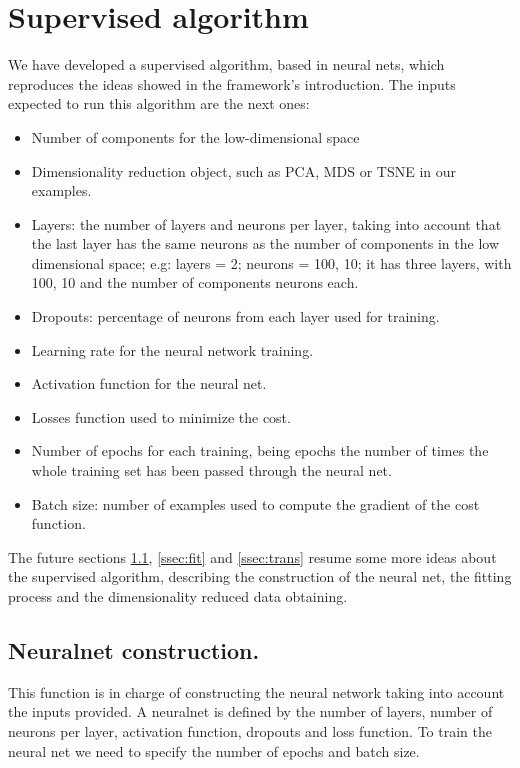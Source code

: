 \documentclass[a4paper,11pt,spanish]{report}
\begin{document}
\newpage

\section{Supervised algorithm}
\label{sec:sup}

We have developed a supervised algorithm, based in neural nets, which reproduces the ideas showed in the framework's introduction.
The inputs expected to run this algorithm are the next ones:
\begin{itemize}
\item Number of components for the low-dimensional space
\item Dimensionality reduction object, such as PCA, MDS or TSNE in our examples.
\item Layers: the number of layers and neurons per layer, taking into account that the last layer has the same neurons as the number of components in the low dimensional space; e.g: layers = 2; neurons = 100, 10; it has three layers, with 100, 10 and the number of components neurons each.
\item Dropouts: percentage of neurons from each layer used for training.
\item Learning rate for the neural network training.
\item Activation function for the neural net.
\item Losses function used to minimize the cost.
\item Number of epochs for each training, being epochs the number of times the whole training set has been passed through the neural net.
\item Batch size: number of examples used to compute the gradient of the cost function.
\end{itemize}

The future sections \ref{ssec:nnc}, \ref{ssec:fit} and \ref{ssec:trans} resume some more ideas about the supervised algorithm, describing the construction of the neural net, the fitting process and the dimensionality reduced data obtaining.

\subsection{Neuralnet construction.}
\label{ssec:nnc}

This function is in charge of constructing the neural network taking into account the inputs provided. A neuralnet is defined by the number of layers, number of neurons per layer, activation function, dropouts and loss function. To train the neural net we need to specify the number of epochs and batch size.
\end{document}
